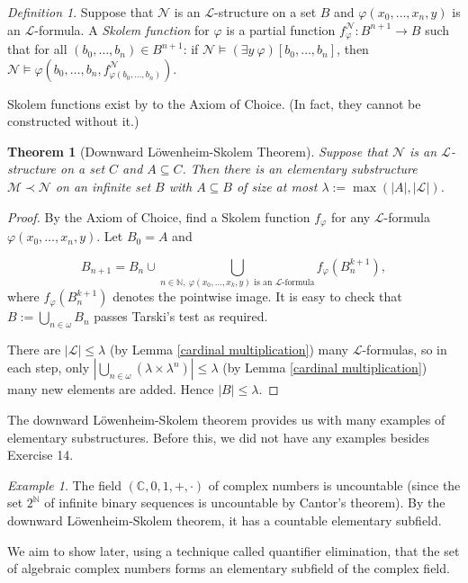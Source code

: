 \documentclass[a4paper, 11pt]{amsart}
\newtheorem{theorem}{Theorem}[subsection]
\theoremstyle{remark}
\newtheorem{definition}[definition]{Definition}
\newtheorem{example}[example]{Example}
\newcommand{\NN}{\mathbb{N}}
\newcommand{\CC}{\mathbb C}
\newcommand{\cL}{\mathcal L}
\newcommand{\cM}{\mathcal M}
\newcommand{\cN}{\mathcal N}
\begin{document}
\begin{definition} 
Suppose that $\cN$ is an $\cL$-structure on a set $B$ and $\varphi(x_0,\dots,x_n,y)$ is an $\cL$-formula. 
A \emph{Skolem function} for $\varphi$ is a partial function $f^\cN_{\varphi}\colon B^{n+1}\rightarrow B$ such that for all $(b_0,\dots,b_n) \in B^{n+1}$: if $\cN \models (\exists y\ \varphi) [b_0,\dots,b_n]$, then $\cN \models \varphi(b_0,\dots,b_n,f^\cN_{\varphi(b_0,\dots,b_n)})$. 
\end{definition} 

Skolem functions exist by to the Axiom of Choice. (In fact, they cannot be constructed without it.) 

\begin{theorem}[Downward L\"owenheim-Skolem Theorem] 
Suppose that $\cN$ is an $\cL$-structure on a set $C$ and $A\subseteq C$. 
Then there is an elementary substructure $\cM\prec \cN$ on an infinite set $B$ with $A\subseteq B$ of size at most $\lambda:=\max(|A|, |\cL|)$. 
\end{theorem} 
\begin{proof} 
By the Axiom of Choice, find a Skolem function $f_\varphi$ for any $\cL$-formula $\varphi(x_0,\dots,x_n,y)$. 
Let $B_0=A$ and 

$$ B_{n+1}=  B_n \cup \bigcup_{n\in\NN,\ \varphi(x_0,\dots,x_k,y) \text{ is an $\cL$-formula}}  f_\varphi (B_n^{k+1}), $$ 
where $f_\varphi (B_n^{k+1})$ denotes the pointwise image. 
It is easy to check that $B:=\bigcup_{n\in\omega} B_n$ passes Tarski's test as required. 

There are $|\cL|\leq \lambda$ (by Lemma \ref{cardinal multiplication}) many $\cL$-formulas, so in each step, only $| \bigcup_{n\in\omega} (\lambda \times \lambda^n)|\leq \lambda$ (by Lemma \ref{cardinal multiplication}) many new elements are added. 
Hence $|B|\leq\lambda$. 
\end{proof} 

The downward L\"owenheim-Skolem theorem provides us with many examples of elementary substructures. 
Before this, we did not have any examples besides Exercise 14. 


\begin{example} 
The field $(\CC,0,1,+,\cdot)$ of complex numbers is uncountable (since the set $2^\NN$ of infinite binary sequences is uncountable by Cantor's theorem). 
By the downward L\"owenheim-Skolem theorem, it has a countable elementary subfield. 

We aim to show later, using a technique called quantifier elimination, that the set of algebraic complex numbers forms an elementary subfield of the complex field. 
\end{example} 
\end{document}
